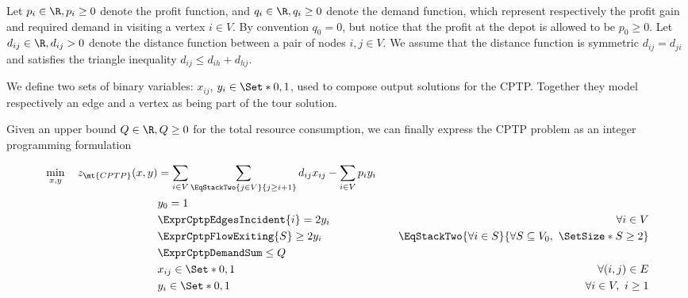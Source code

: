 Let $p_{i} \in \R, p_{i} \ge 0$ denote the profit function, and $q_{i} \in \R, q_{i} \ge 0$ denote the demand function, which represent respectively the profit gain and required demand in visiting a vertex $i \in V$.
By convention $q_0 = 0$, but notice that the profit at the depot is allowed to be $p_0 \ge 0$.
Let $d_{ij} \in \R, d_{ij} > 0$ denote the distance function between a pair of nodes  $i, j \in V$.
We assume that the distance function is symmetric $d_{ij} = d_{ji}$ and satisfies the triangle inequality $d_{ij} \le d_{ih} + d_{hj}$.

We define two sets of binary variables: $x_{ij}$, $y_{i} \in \Set*{0, 1}$, used to compose output solutions for the CPTP.
Together they model respectively an edge and a vertex as being part of the tour solution.

Given an upper bound $Q \in \R,Q \ge 0$ for the total resource consumption, we can finally express the CPTP problem as an integer programming formulation

\begin{align}
	\min_{x,y} \quad z_\mt{CPTP}(x, y) & =  \sum_{i \in V} \sum_{\EqStackTwo{j \in V}{j \ge i + 1}} d_{ij} x_{ij} - \sum_{i \in V} p_i y_i \label{eq:obj-function}                                                                                                                \\
	                                   & y_0 = 1                                                                                                                   & \label{eq:depot-part-of-tour-constraint}                                                                     \\
	                                   & \ExprCptpEdgesIncident{i}  = 2 y_i                                                                                        & \quad \forall i \in V         \label{eq:flow-conservation-constraint}                                        \\
	                                   & \ExprCptpFlowExiting{S} \ge 2 y_{i}                                                                                       & \quad \EqStackTwo{\forall i \in S}{\forall S \subseteq V_0,\ \SetSize*{S} \ge 2} \label{eq:gsec-constraints} \\
	                                   & \ExprCptpDemandSum  \le Q                                                                                                 & \label{eq:resource-upper-bound-constraint}                                                                   \\
	                                   & x_{ij}                   \in \Set*{0, 1}                                                                                  & \quad \forall (i, j) \in E               \label{eq:x-mip-var-bounds}                                         \\
	                                   & y_{i}                    \in \Set*{0, 1}                                                                                  & \quad \forall i \in V,\ i \ge 1          \label{eq:y-mip-var-bounds}
\end{align}

